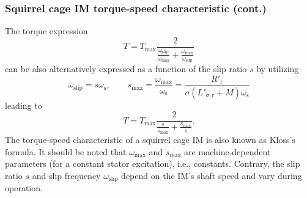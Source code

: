 \begin{frame}
	\frametitle{Squirrel cage IM torque-speed characteristic (cont.)} 
    The torque expression
    \begin{equation}
        T = T_\mathrm{max} \frac{2}{\frac{\omega_\mathrm{slip}}{\omega_\mathrm{max}} + \frac{\omega_\mathrm{max}}{\omega_\mathrm{slip}}}
    \end{equation}
    can be also alternatively expressed as a function of the slip ratio $s$ \pause by utilizing
    $$
        \omega_\mathrm{slip} = s \omega_\mathrm{s}, \qquad s_\mathrm{max} = \frac{\omega_\mathrm{max}}{\omega_\mathrm{s}} = \frac{R'_\mathrm{r}}{\sigma (L'_{\sigma,\mathrm{r}} +M)\omega_\mathrm{s}}
    $$
    \pause
    leading to
    \begin{equation}
        T = T_\mathrm{max} \frac{2}{\frac{s}{s_\mathrm{max}} + \frac{s_\mathrm{max}}{s}}.
    \end{equation}
    \pause
    The torque-speed characteristic of a squirrel cage IM is also known as Kloss's formula. \pause It should be noted that $\omega_\mathrm{max}$ and $s_\mathrm{max}$ are machine-dependent parameters (for a constant stator excitation), i.e., constants. Contrary, the slip ratio $s$ and slip frequency $\omega_\mathrm{slip}$ depend on the IM's shaft speed and vary during operation.
\end{frame}

